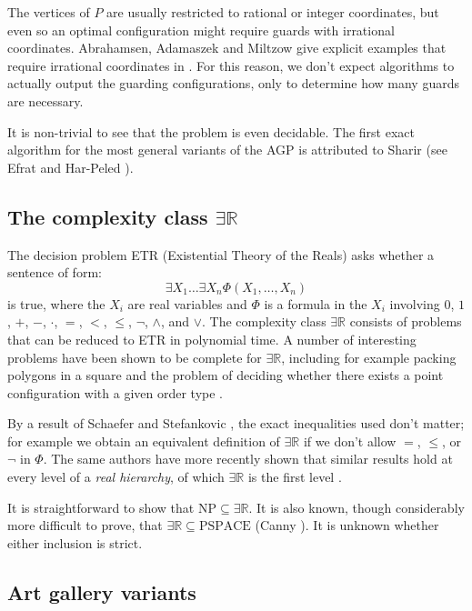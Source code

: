\documentclass[11pt]{article}
\newcommand{\rr}{\mathbb R}
\newcommand{\txt}[1]{\text{#1}}
\theoremstyle{plain}
\theoremstyle{definition}
\numberwithin{theorem}{section}
\begin{document}
The vertices of $P$ are usually restricted to rational or integer coordinates, but even so an optimal configuration might require guards with irrational coordinates. Abrahamsen, Adamaszek and Miltzow give explicit examples that require irrational coordinates in \cite{IrrationalGuards}. For this reason, we don't expect algorithms to actually output the guarding configurations, only to determine how many guards are necessary. 

It is non-trivial to see that the problem is even decidable. The first exact algorithm for the most general variants of the AGP is attributed to Sharir (see Efrat and Har-Peled \cite{FirstExact}). 

\subsection{The complexity class $\exists\rr$}

The decision problem ETR (Existential Theory of the Reals) asks whether a sentence of form:
\[\exists X_1\dots\exists X_n \Phi(X_1,\dots,X_n)\]
is true, where the $X_i$ are real variables and $\Phi$ is a formula in the $X_i$ involving $0$, $1$, $+$, $-$, $\cdot$, $=$, $<$, $\le$, $\neg$, $\wedge$, and $\vee$. The complexity class $\exists\rr$ consists of problems that can be reduced to ETR in polynomial time. A number of interesting problems have been shown to be complete for $\exists\rr$, including for example packing polygons in a square \cite{PackingProblem} and the problem of deciding whether there exists a point configuration with a given order type \cite{Mnev, Stretchability}.

By a result of Schaefer and Stefankovic \cite{ETRRobustness}, the exact inequalities used don't matter; for example we obtain an equivalent definition of $\exists\rr$ if we don't allow $=$, $\le$, or $\neg$ in $\Phi$. The same authors have more recently shown that similar results hold at every level of a \emph{real hierarchy}, of which $\exists\rr$ is the first level \cite{RealHeirarchy}.

It is straightforward to show that $\txt{NP}\subseteq\exists\rr$. It is also known, though considerably more difficult to prove, that $\exists\rr\subseteq \txt{PSPACE}$ (Canny \cite{SubsetPSPACE}). It is unknown whether either inclusion is strict. 

\subsection{Art gallery variants}
\end{document}
